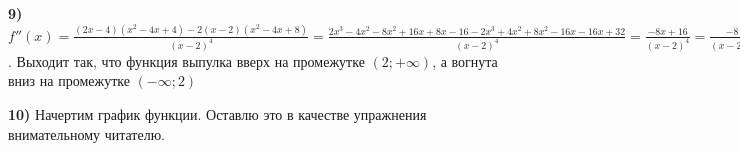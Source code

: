 \documentclass{article}
\begin{document}
\begin{flushleft}
\textbf{9) } $f''(x) = \frac{(2x - 4)(x^2 - 4x + 4) - 2(x - 2)(x^2 - 4x + 8)}{(x - 2)^4} = \frac{2x^3 - 4x^2 - 8x^2 + 16x + 8x - 16 - 2x^3 + 4x^2 + 8x^2 - 16x - 16x + 32}{(x - 2)^4} = \frac{-8x + 16}{(x - 2)^4} = \frac{-8}{(x - 2)^3}$. Выходит так, что функция выпулка вверх на промежутке $(2; +\infty)$, а вогнута вниз на промежутке $(-\infty; 2)$

\textbf{10) } Начертим график функции. Оставлю это в качестве упражнения внимательному читателю.

\end{flushleft}
\end{document}
